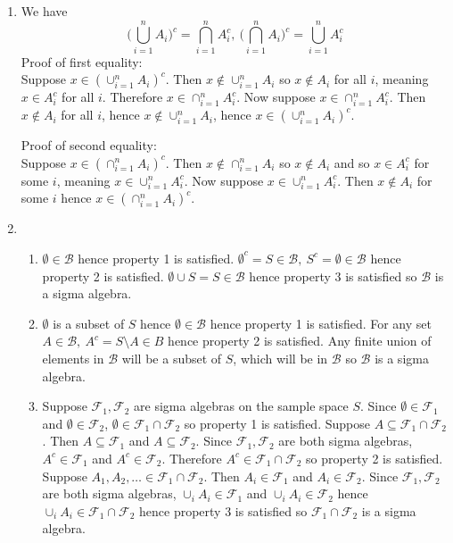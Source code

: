 \documentclass{article}
\begin{document}
\begin{enumerate}
    \item We have \[
    \Big( \bigcup_{i = 1}^{n} A_i \Big)^{c} = \bigcap_{i = 1}^{n} A_{i}^{c}, \
    \Big( \bigcap_{i = 1}^{n} A_i \Big)^{c} = \bigcup_{i = 1}^{n} A_{i}^{c}
    \]
    Proof of first equality: \\
    Suppose $x \in (\cup_{i = 1}^{n} A_i)^c$. Then $x \notin \cup_{i = 1}^{n} A_i$ so 
    $x \notin A_i$ for all $i$, meaning $x \in A_{i}^{c}$ for all $i$. Therefore 
    $x \in \cap_{i = 1}^{n} A_{i}^{c}$. 
    Now suppose $x \in \cap_{i = 1}^{n} A_{i}^{c}$. 
    Then $x \notin A_i$ for all $i$, hence $x \notin \cup_{i = 1}^{n} A_{i}$, hence 
    $x \in (\cup_{i = 1}^{n} A_i)^c$.

    Proof of second equality: \\
    Suppose $x \in (\cap_{i = 1}^{n} A_i)^{c}$. Then $x \notin \cap_{i = 1}^{n} A_i$ so 
    $x \notin A_i$ and so $x \in A_{i}^{c}$ for some $i$, meaning 
    $x \in \cup_{i = 1}^{n} A_i^c$. 
    Now suppose $x \in \cup_{i = 1}^{n} A_i^c$. Then $x \notin A_i$ for some $i$ hence 
    $x \in (\cap_{i = 1}^{n} A_i)^{c}$.

    \item \begin{enumerate}
        \item $\emptyset \in \mathcal{B}$ hence property 1 is satisfied. 
        $\emptyset^{c} = S \in \mathcal{B}, \ S^{c} = \emptyset \in \mathcal{B}$ hence 
        property 2 is satisfied. $\emptyset \cup S = S \in \mathcal{B}$ hence property 
        3 is satisfied so $\mathcal{B}$ is a sigma algebra.
        
        \item $\emptyset$ is a subset of $S$ hence $\emptyset \in \mathcal{B}$ hence property 
        1 is satisfied. For any set $A \in \mathcal{B}, \ A^{c} = S \setminus A \in B$ hence 
        property 2 is satisfied. Any finite union of elements in $\mathcal{B}$ will be a 
        subset of $S$, which will be in $\mathcal{B}$ so $\mathcal{B}$ is a sigma algebra.

        \item Suppose $\mathcal{F}_1, \mathcal{F}_2$ are sigma algebras on the sample space
        $S$. Since $\emptyset \in \mathcal{F}_1$ and $\emptyset \in \mathcal{F}_2$, 
        $\emptyset \in \mathcal{F}_1 \cap \mathcal{F}_2$ so property 1 is satisfied. 
        Suppose $A \subseteq \mathcal{F}_1 \cap \mathcal{F}_2$. Then $A \subseteq \mathcal{F}_1$ 
        and $A \subseteq \mathcal{F}_2$. Since $\mathcal{F}_1, \mathcal{F}_2$ are both sigma 
        algebras, $A^{c} \in \mathcal{F}_1$ and $A^{c} \in \mathcal{F}_2$. Therefore 
        $A^{c} \in \mathcal{F}_1 \cap \mathcal{F}_2$ so property 2 is satisfied.
        Suppose $A_1, A_2, \dots \in \mathcal{F}_1 \cap \mathcal{F}_2$. Then 
        $A_i \in \mathcal{F}_1$ and $A_i \in \mathcal{F}_2$. Since $\mathcal{F}_1, 
        \mathcal{F}_2$ are both sigma algebras, $\cup_{i} A_i \in \mathcal{F}_1$ and 
        $\cup_{i} A_i \in \mathcal{F}_2$ hence $\cup_{i} A_i \in \mathcal{F}_1 
        \cap \mathcal{F}_2$ hence property 3 is satisfied so $\mathcal{F}_1 \cap \mathcal{F}_2$ 
        is a sigma algebra.
    \end{enumerate}


\end{enumerate}
\end{document}
